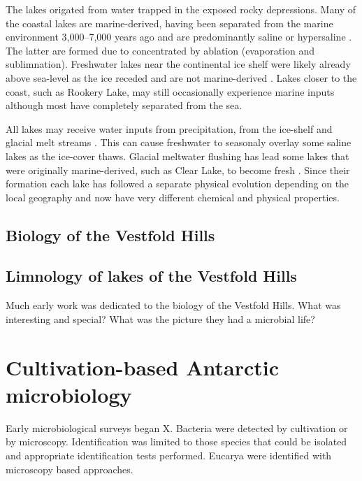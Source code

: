 The lakes origated from water trapped in the exposed rocky depressions.
Many of the coastal lakes are marine-derived, having been separated from the marine environment 3,000--7,000 years ago \cite{Gibson1999} and are predominantly saline or hypersaline \cite{Burke1988}.
The latter are formed due to concentrated by ablation (evaporation and sublimnation). %
Freshwater lakes near the continental ice shelf were likely already above sea-level as the ice receded and are not marine-derived \cite{Laybourne-Parry1992} \cite{Bronge1996}.
Lakes closer to the coast, such as Rookery Lake, may still occasionally experience marine inputs although most have completely separated from the sea. %

All lakes may receive water inputs from precipitation, from the ice-shelf and glacial melt streams \cite{Burton1981}. 
This can cause freshwater to seasonaly overlay some saline lakes as the ice-cover thaws.
Glacial meltwater flushing has lead some lakes that were originally marine-derived, such as Clear Lake, to become fresh \cite{Pickard1986}\cite{Bird1991}.
Since their formation each lake has followed a separate physical evolution depending on the local geography and now have very different chemical and physical properties. 

\subsection{Biology of the Vestfold Hills}

\subsection{Limnology of lakes of the Vestfold Hills}

Much early work was dedicated to the biology of the Vestfold Hills.
What was interesting and special?
What was the picture they had a microbial life?

\section[Antarctic microbiology]{Cultivation-based Antarctic microbiology}

Early microbiological surveys began X.
Bacteria were detected by cultivation or by microscopy. 
Identification was limited to those species that could be isolated and appropriate identification tests performed.
Eucarya were identified with microscopy based approaches.


